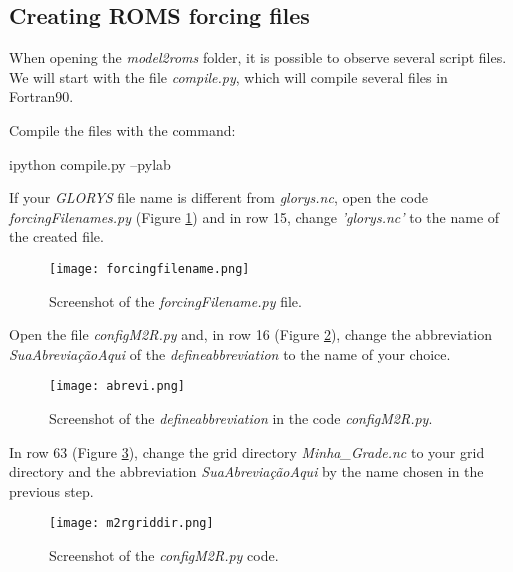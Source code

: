 \subsection{Creating ROMS forcing files}
\bigskip

\noindent When opening the \textit{model2roms} folder, it is possible to observe several script files. 
We will start with the file \textit{compile.py}, which will compile several files in Fortran90. 
\bigskip

\noindent Compile the files with the command:
\bigskip

\begin{bashcode}
ipython compile.py --pylab
\end{bashcode}
\bigskip

\noindent If your \textit{GLORYS} file name is different from \textit{glorys.nc}, open the code \textit{forcingFilenames.py} 
(Figure \textcolor{bleu_cite}{\ref{forcingfilename}}) and in row 15, change \textit{'glorys.nc'} to the name of the created file.
\bigskip

\bigskip

\begin{figure}[H]
    \centering
    \texttt{[image: forcingfilename.png]}
    \caption{Screenshot of the \textit{forcingFilename.py} file.}
    \label{forcingfilename}
\end{figure}
\bigskip

\noindent Open the file \textit{configM2R.py} and, in row 16 (Figure \textcolor{bleu_cite}{\ref{abrev}}), change the abbreviation \textit{SuaAbreviaçãoAqui} 
of the \textit{defineabbreviation} to the name of your choice.
\bigskip

\begin{figure}[H]
    \centering
    \texttt{[image: abrevi.png]}
    \caption{Screenshot of the \textit{defineabbreviation} in the code \textit{configM2R.py}.}
    \label{abrev}
\end{figure}
\bigskip

\noindent In row 63 (Figure \textcolor{bleu_cite}{\ref{gradediretoriom2r}}), change the grid directory \textit{Minha\_Grade.nc} to your 
grid directory and the abbreviation \textit{SuaAbreviaçãoAqui} by the name chosen in the previous step.
\bigskip

\begin{figure}[H]
    \centering
    \texttt{[image: m2rgriddir.png]}
    \caption{Screenshot of the \textit{configM2R.py} code.
    }
    \label{gradediretoriom2r}
\end{figure}
\bigskip

